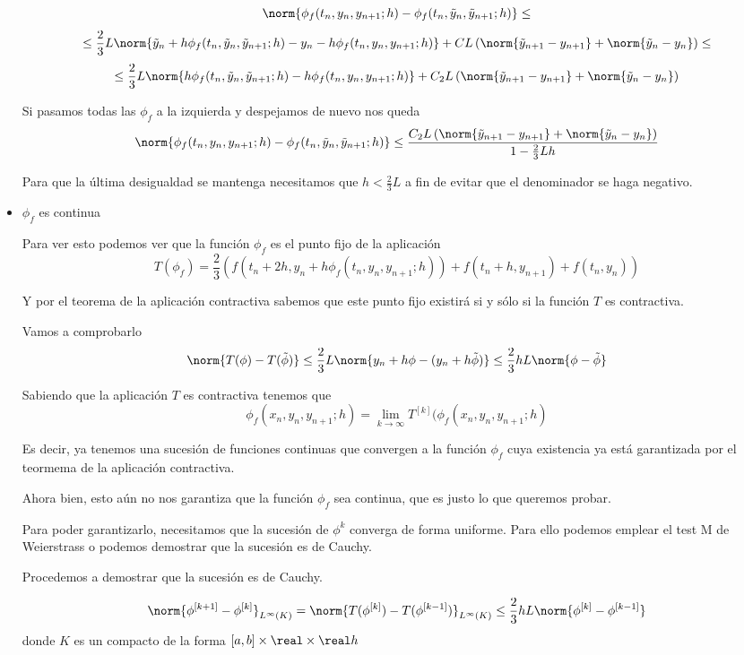 \begin{problem}[3]
\begin{itemize}
\[\norm{\phi_f(t_n,y_n,y_{n+1};h) - \phi_f(t_n,\tilde{y}_n,\tilde{y}_{n+1};h)} \leq \]
\[\leq\frac{2}{3}L\norm{\tilde{y}_n+h \phi_f(t_n,\tilde{y}_n,\tilde{y}_{n+1};h) - y_n-h \phi_f(t_n,y_n,y_{n+1};h)} + CL\left(\norm{\tilde{y}_{n+1}-y_{n+1}}+\norm{\tilde{y}_n - y_n}\right)\leq\]
\[\leq \frac{2}{3}L\norm{h \phi_f(t_n,\tilde{y}_n,\tilde{y}_{n+1};h)-h \phi_f(t_n,y_n,y_{n+1};h)} + C_2L\left(\norm{\tilde{y}_{n+1}-y_{n+1}}+\norm{\tilde{y}_n - y_n}\right)\]

Si pasamos todas las $\phi_f$ a la izquierda y despejamos de nuevo nos queda
\[\norm{\phi_f(t_n,y_n,y_{n+1};h) - \phi_f(t_n,\tilde{y}_n,\tilde{y}_{n+1};h)} \leq \frac{C_2L\left(\norm{\tilde{y}_{n+1}-y_{n+1}}+\norm{\tilde{y}_n - y_n}\right)}{1-\frac{2}{3}Lh}\]

Para que la última desigualdad se mantenga necesitamos que $h < \frac{2}{3}L$ a fin de evitar que el denominador se haga negativo.

\item $\phi_f$ es continua

Para ver esto podemos ver que la función $\phi_f$ es el punto fijo de la aplicación
\[T(\phi_f) = \frac{2}{3}\left(f(t_n+2h,y_n+h\phi_f(t_n,y_n,y_{n+1};h))+f(t_n+h,y_{n+1})+f(t_n,y_n) \right)\]

Y por el teorema de la aplicación contractiva sabemos que este punto fijo existirá si y sólo si la función $T$ es contractiva.

Vamos a comprobarlo
\[\norm{T(\phi)-T(\tilde{\phi})} \leq \frac{2}{3}L\norm{y_n+h\phi - (y_n+h\tilde{\phi})} \leq \frac{2}{3}hL\norm{\phi-\tilde{\phi}}\]

Sabiendo que la aplicación $T$ es contractiva tenemos que 
\[\phi_f(x_n,y_n,y_{n+1};h)=\lim_{k \to \infty} T^{[k]}(\phi_f(x_n,y_n,y_{n+1};h)\]

Es decir, ya tenemos una sucesión de funciones continuas que convergen a la función $\phi_f$ cuya existencia ya está garantizada por el teormema de la aplicación contractiva.

Ahora bien, esto aún no nos garantiza que la función $\phi_f$ sea continua, que es justo lo que queremos probar. 

Para poder garantizarlo, necesitamos que la sucesión de $\phi^{k}$ converga de forma uniforme. Para ello podemos emplear el test M de Weierstrass o podemos demostrar que la sucesión es de Cauchy.

Procedemos a demostrar que la sucesión es de Cauchy.

\[\norm{\phi^{[k+1]}-\phi^{[k]}}_{L^{\infty}(K)}=\norm{T(\phi^{[k]}) - T(\phi^{[k-1]})}_{L^{\infty}(K)} \leq \frac{2}{3}hL\norm{\phi^{[k]}-\phi^{[k-1]}} \]
donde $K$ es un compacto de la forma $[a,b] \times \real \times \real h$


\end{itemize}
\end{problem}

